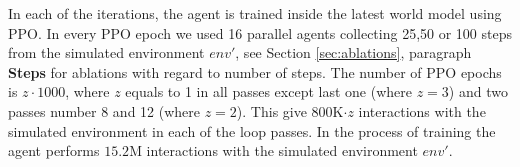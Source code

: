 In each of the iterations, the agent is trained inside the latest world model using PPO.
In every PPO epoch we used 16 parallel agents collecting 25,50 or 100 steps from the simulated environment $env'$, see Section \ref{sec:ablations}, paragraph {\bf Steps} for ablations with regard to number of steps.
The number of PPO epochs is $z\cdot 1000$, where $z$ equals to 1 in all passes except last one (where $z = 3$) and two passes number 8 and 12 (where $z = 2$).
This give $800$K$\cdot z$ interactions with the simulated environment in each of the loop passes. In the process of training the agent performs  $15.2$M interactions with the simulated environment $env'$.

